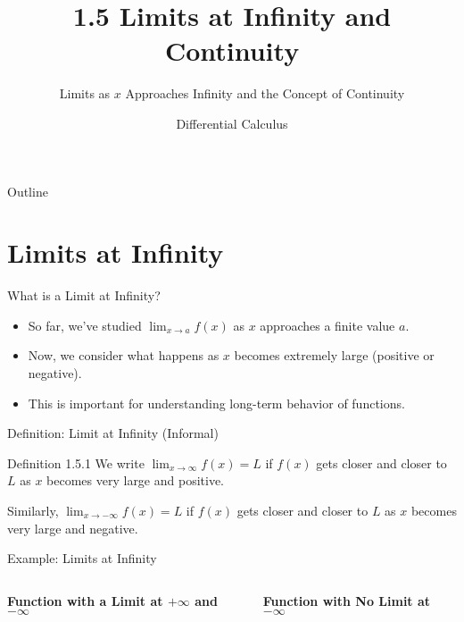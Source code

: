 \documentclass[aspectratio=169]{beamer}
\title{1.5 Limits at Infinity and Continuity}
\subtitle{Limits as $x$ Approaches Infinity and the Concept of Continuity}
\author{Differential Calculus}
\date{}
\newcommand{\limx}[2]{\lim_{x \to #1} #2}
\begin{document}
\begin{frame}
\titlepage
\end{frame}

\begin{frame}{Outline}
\tableofcontents
\end{frame}

\section{Limits at Infinity}

\begin{frame}{What is a Limit at Infinity?}
\begin{itemize}
  \item So far, we've studied $\limx{a}{f(x)}$ as $x$ approaches a finite value $a$.
  \item Now, we consider what happens as $x$ becomes extremely large (positive or negative).
  \item This is important for understanding long-term behavior of functions.
\end{itemize}
\end{frame}

\begin{frame}{Definition: Limit at Infinity (Informal)}
\begin{block}{Definition 1.5.1}
We write $\limx{\infty}{f(x)} = L$ if $f(x)$ gets closer and closer to $L$ as $x$ becomes very large and positive.

Similarly, $\lim_{x \to -\infty} f(x) = L$ if $f(x)$ gets closer and closer to $L$ as $x$ becomes very large and negative.
\end{block}
\end{frame}

\begin{frame}{Example: Limits at Infinity}
\begin{columns}
\textbf{Function with a Limit at $+\infty$ and $-\infty$}
\textbf{Function with No Limit at $-\infty$}
\end{columns}
\end{frame}
\end{document}

